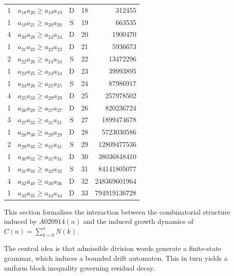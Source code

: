 \documentclass[12pt, oneside]{article}
\numberwithin{equation}{section}
\theoremstyle{definition}
\theoremstyle{plain}
\theoremstyle{remark}
\begin{document}
\begin{table}[htbp]
\begin{tabular}{@{}rccrr@{}}
1 & $a_{18} a_{20} \ge a_{19} a_{19}$ & D & 18 &       312455 \\
1 & $a_{19} a_{21} \ge a_{20} a_{20}$ & S & 19 &       663535 \\
4 & $a_{20} a_{28} \ge a_{24} a_{24}$ & D & 20 &      1900470 \\
1 & $a_{21} a_{23} \ge a_{22} a_{22}$ & D & 21 &      5936673 \\
2 & $a_{22} a_{26} \ge a_{24} a_{24}$ & S & 22 &     13472296 \\
1 & $a_{23} a_{25} \ge a_{24} a_{24}$ & D & 23 &     39993895 \\
1 & $a_{24} a_{26} \ge a_{25} a_{25}$ & S & 24 &     87986917 \\
4 & $a_{25} a_{33} \ge a_{29} a_{29}$ & D & 25 &    257978502 \\
1 & $a_{26} a_{28} \ge a_{27} a_{27}$ & D & 26 &    820236724 \\
3 & $a_{27} a_{33} \ge a_{31} a_{31}$ & S & 27 &   1899474678 \\
1 & $a_{28} a_{30} \ge a_{29} a_{29}$ & D & 28 &   5723030586 \\
2 & $a_{29} a_{33} \ge a_{31} a_{31}$ & S & 29 &  12809477536 \\
1 & $a_{30} a_{32} \ge a_{31} a_{31}$ & D & 30 &  38036848410 \\
1 & $a_{31} a_{33} \ge a_{32} a_{32}$ & S & 31 &  84141805077 \\
4 & $a_{32} a_{40} \ge a_{36} a_{36}$ & D & 32 & 248369601964 \\
1 & $a_{33} a_{35} \ge a_{34} a_{34}$ & D & 33 & 794919136728 \\
\bottomrule
\end{tabular}
\end{table}

This section formalises the interaction between the combinatorial
structure induced by $A020914(n)$ and the induced growth dynamics
of $C(n) = \sum_{k=0}^n N(k)$.

The central idea is that admissible division words generate a
finite-state grammar, which induces a bounded drift automaton.
This in turn yields a uniform block inequality governing residual decay.

\end{document}
